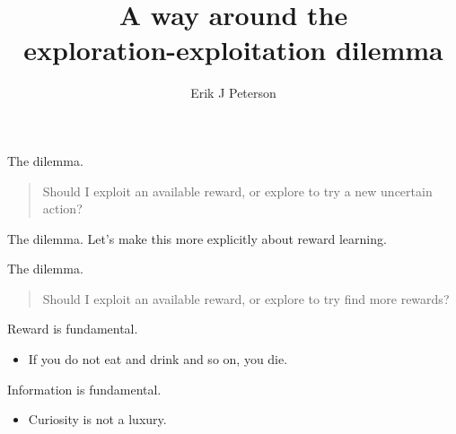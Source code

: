 \documentclass[10pt]{beamer}
\title{A way around the\\ exploration-exploitation dilemma}
\date{}
\author{Erik J Peterson}
\institute{Research fellow | CoAxLab\\
Carnegie Mellon University\\
\url{robotpuggle.com}}
\begin{document}
\maketitle


    

\begin{frame}[fragile]{The dilemma.}
    \begin{quote}
        Should I exploit an available reward, or explore to try a new uncertain action? 
    \end{quote}
\end{frame}

\begin{frame}[fragile]{The dilemma.}
Let's make this more explicitly about reward learning.
\end{frame}

\begin{frame}[fragile]{The dilemma.}
    \begin{quote}
        Should I exploit an available reward, or explore to try find more rewards? 
    \end{quote}
\end{frame}

\begin{frame}[fragile]{Reward is fundamental.}
\begin{itemize}
    \item If you do not eat and drink and so on, you die.
\end{itemize}
\end{frame}

\begin{frame}[fragile]{Information is fundamental.}
\begin{itemize}
    \item Curiosity is not a luxury.
\end{itemize}
\end{frame}
\end{document}

